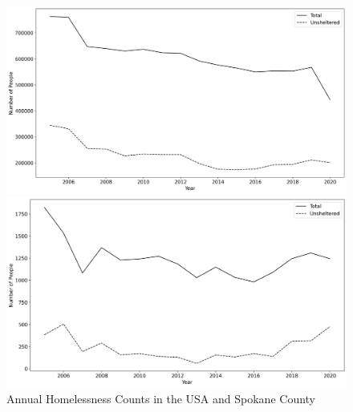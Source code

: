 \documentclass[10pt,letterpaper]{article}
\newcommand{\red}[1]{{\color{red}{#1}}}
\begin{document}
\begin{figure}[H]
    \begin{minipage}{0.5\textwidth}
        \includegraphics[width=\textwidth]{../img/homelessness_usa.png} 
    \end{minipage}
    \begin{minipage}{0.5\textwidth}
        \includegraphics[width=\textwidth]{../img/homelessness_spokane.png}
    \end{minipage}
    \caption[Annual Homelessness Counts in the USA and Spokane County]{Annual Homelessness Counts in the USA and Spokane County
    ~\cite{PITcount}   \\ \red{font size need to be far larger on axes, perhaps thicker lines in plots}    }
    \label{fig:Homeless_US_Spokane}
\end{figure}

\end{document}
